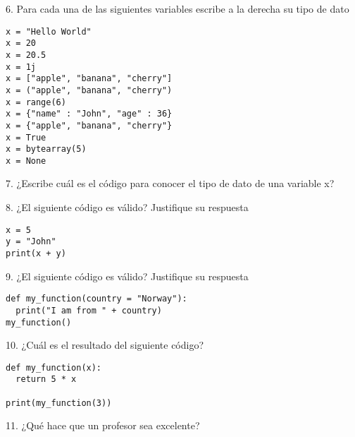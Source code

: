 \documentclass[10pt]{article}
\begin{document}
\vspace{2cm} %

\textmd{6. Para cada una de las siguientes variables escribe a la derecha su tipo de dato}
\begin{lstlisting}
x = "Hello World"
x = 20
x = 20.5
x = 1j
x = ["apple", "banana", "cherry"]
x = ("apple", "banana", "cherry")
x = range(6)
x = {"name" : "John", "age" : 36}
x = {"apple", "banana", "cherry"}
x = True
x = bytearray(5)
x = None
\end{lstlisting}

\textmd{7. ¿Escribe cuál es el código para conocer el tipo de dato de una variable x?}
\vspace{3cm} %

\textmd{8. ¿El siguiente código es válido? Justifique su respuesta}
\begin{lstlisting}
x = 5
y = "John"
print(x + y)
\end{lstlisting}

\vspace{3cm} %

\textmd{9. ¿El siguiente código es válido? Justifique su respuesta}
\begin{lstlisting}
def my_function(country = "Norway"):
  print("I am from " + country)
my_function()
\end{lstlisting}

\vspace{4cm} %

\textmd{10. ¿Cuál es el resultado del siguiente código?}
\begin{lstlisting}
def my_function(x):
  return 5 * x

print(my_function(3))
\end{lstlisting}

\vspace{2cm} %

\textmd{11. ¿Qué hace que un profesor sea excelente?}
\vspace{4cm} %
\end{document}
